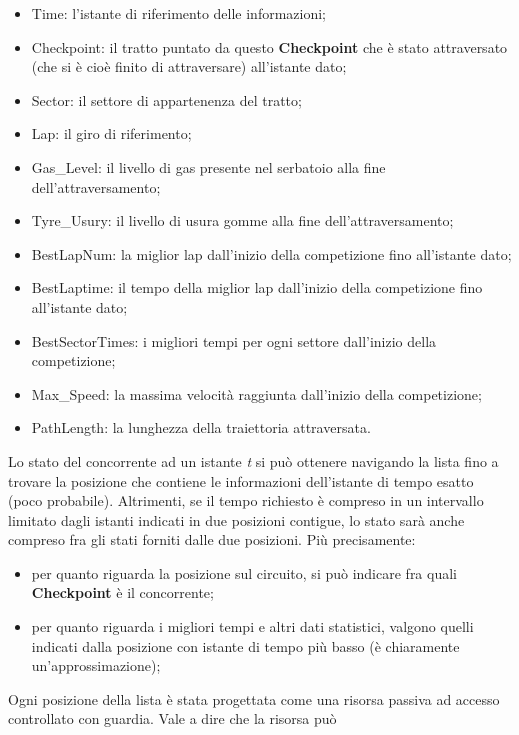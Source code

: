      \begin{itemize}
     \item Time: l'istante di riferimento delle informazioni;
     \item Checkpoint: il tratto puntato da questo \textbf{Checkpoint} che è
stato attraversato (che si è cioè finito di attraversare) 
     all'istante dato;
     \item Sector: il settore di appartenenza del tratto;
     \item Lap: il giro di riferimento;
     \item Gas\_Level: il livello di gas presente nel serbatoio alla fine
dell'attraversamento;
     \item Tyre\_Usury: il livello di usura gomme alla fine
dell'attraversamento;
     \item BestLapNum: la miglior lap dall'inizio della competizione fino
all'istante dato;
     \item BestLaptime: il tempo della miglior lap dall'inizio della
competizione fino all'istante dato;
     \item BestSectorTimes: i migliori tempi per ogni settore dall'inizio della
competizione;
     \item Max\_Speed: la massima velocità raggiunta dall'inizio della
competizione;
     \item PathLength: la lunghezza della traiettoria attraversata.
     \end{itemize}
     Lo stato del concorrente ad un istante \emph{t} si può ottenere navigando
la lista fino a trovare la posizione che contiene le informazioni
     dell'istante di tempo esatto (poco probabile). Altrimenti, se il tempo
richiesto è compreso in un intervallo limitato dagli istanti
     indicati in due posizioni contigue, lo stato sarà anche compreso fra gli
stati forniti dalle due posizioni. Più precisamente:\\
     \begin{itemize}
     \item per quanto riguarda la posizione sul circuito, si può indicare fra
quali \textbf{Checkpoint} è il concorrente;
     \item per quanto riguarda i migliori tempi e altri dati statistici, valgono
quelli indicati dalla posizione con istante di tempo più basso (è chiaramente
     un'approssimazione);
     \end{itemize}
     Ogni posizione della lista è stata progettata come una risorsa passiva ad
accesso controllato con guardia. Vale a dire che la risorsa può
